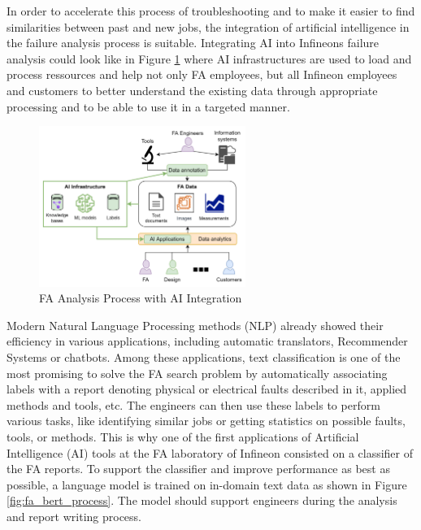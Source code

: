 In order to accelerate this process of troubleshooting and to make it easier to find similarities between past and new jobs, the integration of artificial intelligence in the failure analysis process is suitable. Integrating AI into Infineons failure analysis could look like in Figure \ref{fig:ai_process} where AI infrastructures are used to load and process ressources and help not only FA employees, but all Infineon employees and customers to better understand the existing data through appropriate processing and to be able to use it in a targeted manner.

\begin{figure}[H]
	\centering
	\includegraphics[width=0.6\textwidth]{figures/ai_process_idea.png}
	\caption{FA Analysis Process with AI Integration}
	\label{fig:ai_process}
\end{figure}

Modern Natural Language Processing methods (NLP) already showed their efficiency in various applications, including automatic translators, Recommender Systems or chatbots. Among these applications, text classification is one of the most promising to solve the FA search problem by automatically associating labels with a report denoting physical or electrical faults described in it, applied methods and tools, etc. The engineers can then use these labels to perform various tasks, like identifying similar jobs or getting statistics on possible faults, tools, or methods. \newline
This is why one of the first applications of Artificial Intelligence (AI) tools at the FA laboratory of Infineon consisted on a classifier of the FA reports. To support the classifier and improve performance as best as possible, a language model is trained on in-domain text data as shown in Figure \ref{fig:fa_bert_process}. The model should support engineers during the analysis and report writing process.

